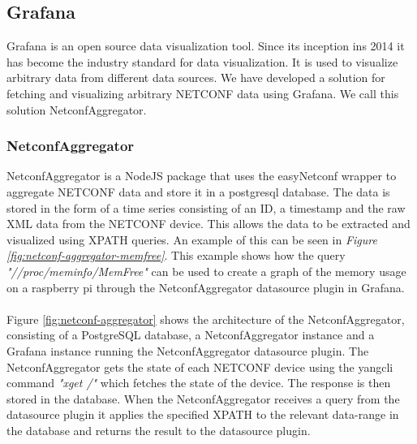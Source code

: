 \documentclass[12pt]{article}
\begin{document}
\newpage

\subsection{Grafana}
Grafana is an open source data visualization tool. Since its inception ins 2014 it has become the industry standard
for data visualization. It is used to visualize arbitrary data from different data sources.
We have developed a solution for fetching and visualizing arbitrary NETCONF data using Grafana.
We call this solution NetconfAggregator.

\subsubsection{NetconfAggregator}
NetconfAggregator is a NodeJS package that uses the easyNetconf wrapper 
\cite{heimonenSlenderman00Netconfaggregator2025} to aggregate NETCONF data and store 
it in a postgresql database. The data is stored in the form of a time series consisting of an ID, a timestamp and the 
raw XML data from the NETCONF device. This allows the data to be extracted and visualized using XPATH queries.
An example of this can be seen in \textit{Figure \ref{fig:netconf-aggregator-memfree}}.
This example shows how the query \textit{"//proc/meminfo/MemFree"} can be used to create a graph of the memory usage 
on a raspberry pi through the NetconfAggregator datasource plugin in Grafana.
\\
\\
Figure \ref{fig:netconf-aggregator} shows the architecture of the NetconfAggregator, consisting
of a PostgreSQL database, a NetconfAggregator instance and a Grafana instance running the NetconfAggregator datasource plugin.
The NetconfAggregator gets the state of each NETCONF device using the yangcli command \textit{"xget /"} which
fetches the state of the device. The response is then stored in the database.
When the NetconfAggregator receives a query from the datasource plugin it applies the specified XPATH to 
the relevant data-range in the database and returns the result to the datasource plugin.
\end{document}
